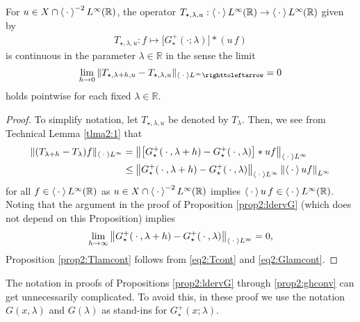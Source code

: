 \documentclass[../dissertation]{subfiles}
\begin{document}
\begin{prop}\label{prop2:Tlamcont}
	For $u \in X \cap \left\langle \kern 0.5ex \cdot \kern 0.5ex \right\rangle^{-2}L^\infty(\mathbb R)$, the operator 
	$T_{\star, \lambda, u} : \left\langle \kern 0.5ex \cdot \kern 0.5ex \right\rangle L^\infty(\mathbb R) \to 
	\left\langle \kern 0.5ex \cdot \kern 0.5ex \right\rangle L^\infty(\mathbb R)$ given by 
	\begin{align*}
		T_{\star, \lambda, u} : f\mapsto \big[G_\star^+(\cdot; \lambda)\big]*(u\,f)
	\end{align*}
	is continuous in the parameter $\lambda \in \mathbb R$ in the sense the limit 
	\[
		\lim_{h\to0} \| T_{\star, \lambda+h, u} - T_{\star, \lambda, u}
			 \|_{\inn{\dotarg}L^\infty\toitself}
			=0
	\]
	holds pointwise for each fixed $\lambda \in \mathbb R$.
\end{prop}
\begin{proof}
	To simplify notation, let $T_{\star, \lambda, u}$ be denoted by 
	$T_\lambda$. Then, we see from Technical Lemma \ref{tlma2:1}
	that
	\begin{align}\label{eq2:Tcont}
		\|(T_{\lambda+h} - T_\lambda)f\|_{\left\langle \kern 0.5ex \cdot \kern 0.5ex \right\rangle L^\infty}
			&= 
				\left\| 
					\big[ 
						G_\star^+(\kern 0.5ex \cdot \kern 0.5ex, \lambda+h) 
						- G_\star^+(\kern 0.5ex \cdot \kern 0.5ex, \lambda)
					\big]
					*uf
				\right\|_{\left\langle \kern 0.5ex \cdot \kern 0.5ex \right\rangle L^\infty}  \\
			&\leq 
				\left\| 
						G_\star^+(\kern 0.5ex \cdot \kern 0.5ex, \lambda+h) 
						- G_\star^+(\kern 0.5ex \cdot \kern 0.5ex, \lambda)
				\right\|_{\left\langle \kern 0.5ex \cdot \kern 0.5ex \right\rangle L^\infty}
				\left\|
					\left\langle \kern 0.5ex \cdot \kern 0.5ex \right\rangle u f
				\right\|_{L^\infty}
				\nonumber
	\end{align}
	for all $f \in \left\langle \kern 0.5ex \cdot \kern 0.5ex \right\rangle L^\infty(\mathbb R)$ as 
	$u \in X \cap \left\langle \kern 0.5ex \cdot \kern 0.5ex \right\rangle^{-2}L^\infty(\mathbb R)$ implies 
	$\left\langle \kern 0.5ex \cdot \kern 0.5ex \right\rangle u\, f\in \left\langle \kern 0.5ex \cdot \kern 0.5ex \right\rangle L^\infty(\mathbb R)$. 
	Noting that the argument in the proof of Proposition 
	\ref{prop2:ldervG} (which does not depend on this Proposition) implies
	\begin{align}\label{eq2:Glamcont}
		\lim_{h\to\infty} 
			\left\| 
					G_\star^+(\kern 0.5ex \cdot \kern 0.5ex, \lambda+h) 
					- G_\star^+(\kern 0.5ex \cdot \kern 0.5ex, \lambda)
			\right\|_{\left\langle \kern 0.5ex \cdot \kern 0.5ex \right\rangle L^\infty}
			=0,
	\end{align}
	Proposition \ref{prop2:Tlamcont} follows from \eqref{eq2:Tcont}
	and \eqref{eq2:Glamcont}.
\end{proof}


\begin{rmk}\label{rmk2:notation}
	The notation in proofs of Propositions \ref{prop2:ldervG} through 
	\ref{prop2:ghconv} can get unnecessarily complicated. To avoid this, 
	in these proof we use the notation $G(x, \lambda)$ and $G(\lambda)$ 
	as stand-ins for $G_\star^+(x; \lambda)$. 
\end{rmk}
\end{document}
